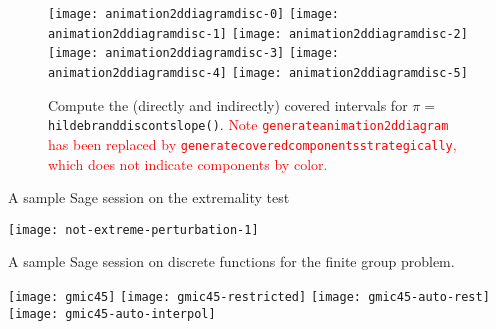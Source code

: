 \documentclass[10pt,reqno]{amsart}
\def\Myunderscore{\textunderscore}%
\newcommand\underscore{\Myunderscore\allowbreak}
\let\_=\underscore
\DeclareRobustCommand\sage[1]{\texttt{#1}}
\begin{document}
\clearpage
\begin{figure}[h]
\centering
\texttt{[image: animation\_2d\_diagram\_disc-0]}
\texttt{[image: animation\_2d\_diagram\_disc-1]}
\texttt{[image: animation\_2d\_diagram\_disc-2]}
\\
\texttt{[image: animation\_2d\_diagram\_disc-3]}
\texttt{[image: animation\_2d\_diagram\_disc-4]}
\texttt{[image: animation\_2d\_diagram\_disc-5]}
\caption{Compute the (directly and indirectly) covered intervals for
  \sage{$\pi=$ hildebrand\_discont\_3\_slope\_1()}.  \textcolor{red}{Note
    \sage{generate\_animation\_2d\_diagram} has been replaced by
    \sage{generate\_covered\_components\_strategically}, which does not
    indicate components by color.}  }
\label{fig:compute_covered_intervals_disc}
\end{figure} 

\setcounter{table}{2}
\begin{table}[h]
  \caption{A sample Sage session on the extremality test}
  \label{tab:extremality_test}
  {\texttt{[image: not-extreme-perturbation-1]}}
\end{table}

\begin{table}[h]
  \caption{A sample Sage session on discrete functions for the finite group problem.}
  \label{tab:discrete-funtions}
  \texttt{[image: gmic45]}
  \texttt{[image: gmic45-restricted]}
  \texttt{[image: gmic45-auto-rest]}
  \texttt{[image: gmic45-auto-interpol]}
\end{table}
\end{document}

